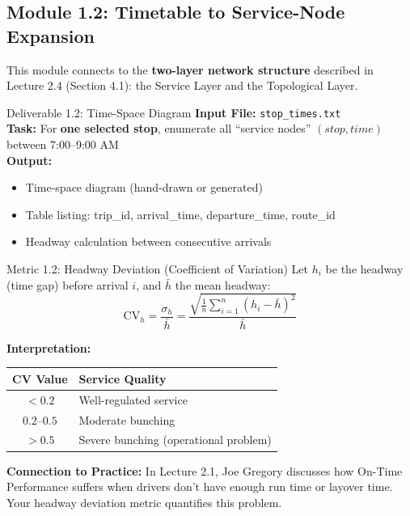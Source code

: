 \documentclass[11pt,letterpaper]{article}
\begin{document}
\subsection{Module 1.2: Timetable to Service-Node Expansion}

This module connects to the \textbf{two-layer network structure} described in Lecture 2.4 (Section 4.1): the Service Layer and the Topological Layer.

\begin{deliverablebox}{Deliverable 1.2: Time-Space Diagram}
\textbf{Input File:} \texttt{stop\_times.txt}\\
\textbf{Task:} For \textbf{one selected stop}, enumerate all ``service nodes'' $(stop, time)$ between 7:00--9:00 AM\\
\textbf{Output:} 
\begin{itemize}[nosep]
    \item Time-space diagram (hand-drawn or generated)
    \item Table listing: trip\_id, arrival\_time, departure\_time, route\_id
    \item Headway calculation between consecutive arrivals
\end{itemize}
\end{deliverablebox}

\begin{metricbox}{Metric 1.2: Headway Deviation (Coefficient of Variation)}
Let $h_i$ be the headway (time gap) before arrival $i$, and $\bar{h}$ the mean headway:
\[
\text{CV}_h = \frac{\sigma_h}{\bar{h}} = \frac{\sqrt{\frac{1}{n}\sum_{i=1}^{n}(h_i - \bar{h})^2}}{\bar{h}}
\]

\textbf{Interpretation:}
\begin{center}
\begin{tabular}{cl}
\toprule
\textbf{CV Value} & \textbf{Service Quality} \\
\midrule
$< 0.2$ & Well-regulated service \\
$0.2$--$0.5$ & Moderate bunching \\
$> 0.5$ & Severe bunching (operational problem) \\
\bottomrule
\end{tabular}
\end{center}

\textbf{Connection to Practice:} In Lecture 2.1, Joe Gregory discusses how On-Time Performance suffers when drivers don't have enough run time or layover time. Your headway deviation metric quantifies this problem.
\end{metricbox}
\end{document}
